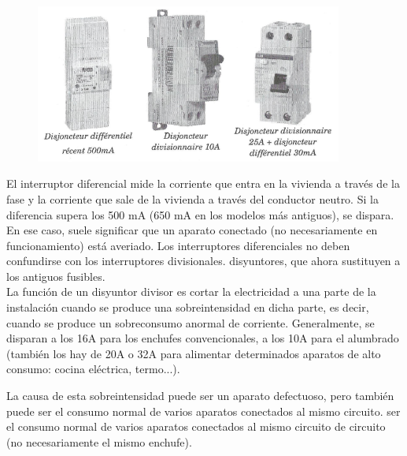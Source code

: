 \documentclass[a5paper,twoside,openany]{book}
\begin{document}
\begin{figure}[h]
\includegraphics[width=0.9\textwidth]{disyunctores} 
\centering
\end{figure}

El interruptor diferencial mide la corriente que entra en la vivienda a través de la fase y la corriente que sale de la vivienda a través del conductor neutro.
Si la diferencia supera los 500 mA (650 mA en los modelos más antiguos), se dispara.
En ese caso, suele significar que un aparato conectado (no necesariamente en funcionamiento) está averiado.
Los interruptores diferenciales no deben confundirse con los interruptores divisionales.
disyuntores, que ahora sustituyen a los antiguos fusibles.\\

La función de un disyuntor divisor es cortar la electricidad a una parte de la instalación cuando se produce una sobreintensidad en dicha parte, es decir, cuando se produce un sobreconsumo anormal de corriente.
Generalmente, se disparan a los 16A para los enchufes convencionales, a los 10A
para el alumbrado (también los hay de 20A o 32A para alimentar determinados aparatos de alto consumo: cocina eléctrica, termo...).

La causa de esta sobreintensidad puede ser un aparato defectuoso, pero también puede ser el consumo normal de varios aparatos conectados al mismo circuito.
ser el consumo normal de varios aparatos conectados al mismo circuito de
circuito (no necesariamente el mismo enchufe).

\noindent{}\\
\end{document}
